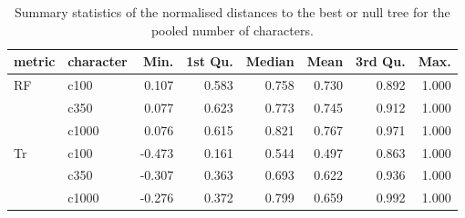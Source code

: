 \begin{table}[ht]
\centering
\begin{tabular}{llrrrrrr}
  \hline
metric & character & Min. & 1st Qu. & Median & Mean & 3rd Qu. & Max. \\ 
  \hline
RF & c100 & 0.107 & 0.583 & 0.758 & 0.730 & 0.892 & 1.000 \\ 
   & c350 & 0.077 & 0.623 & 0.773 & 0.745 & 0.912 & 1.000 \\ 
   & c1000 & 0.076 & 0.615 & 0.821 & 0.767 & 0.971 & 1.000 \\ 
  Tr & c100 & -0.473 & 0.161 & 0.544 & 0.497 & 0.863 & 1.000 \\ 
   & c350 & -0.307 & 0.363 & 0.693 & 0.622 & 0.936 & 1.000 \\ 
   & c1000 & -0.276 & 0.372 & 0.799 & 0.659 & 0.992 & 1.000 \\ 
   \hline
\end{tabular}
\caption{Summary statistics of the normalised distances to the best or null tree for the pooled number of characters.} 
\label{Tab_pooledcharacters}
\end{table}
